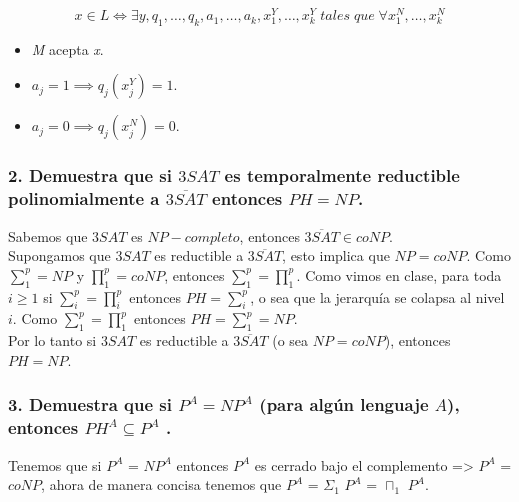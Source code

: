 \documentclass[12pt]{article}
\begin{document}
\begin{equation*}
x \in L \iff \exists y, q_1,\dots,q_k,a_1,\dots,a_k, x^Y_1,\dots,x^Y_k \; tales  \; que \; \forall x^N_1,\dots,x^N_k 
\end{equation*}
\begin{itemize}
\item \textit{M} acepta \textit{x}.
\item $a_j = 1 \implies q_j(x^Y_j) = 1$.
\item $a_j = 0 \implies q_j(x^N_j) = 0$.
\end{itemize}

\subsubsection*{2. Demuestra que si $3SAT$ es temporalmente reductible polinomialmente a $\overline{3SAT}$ entonces $PH = NP$.}
Sabemos que $3SAT$ es $NP-completo$, entonces $\overline{3SAT} \in coNP$. \\
Supongamos que $3SAT$ es reductible a $\overline{3SAT}$, esto implica que $NP = coNP$. Como $\sum_1^p = NP$ y $\prod_1^p = coNP$, entonces $\sum_1^p = \prod_1^p$. Como vimos en clase, para toda $i \geq 1$ si $\sum_i^p = \prod_i^p$ entonces $PH = \sum_i^p$, o sea que la jerarquía se colapsa al nivel $i$. Como $\sum_1^p = \prod_1^p$ entonces $PH = \sum_1^p = NP$. \\
Por lo tanto si $3SAT$ es reductible a $\overline{3SAT}$ (o sea $NP = coNP$), entonces $PH = NP$.

\subsubsection*{3. Demuestra que si $P^A = NP^A$ (para algún lenguaje $A$), entonces $PH^A \subseteq P^A$ .}
Tenemos que si $P^A$ = $NP^A$ entonces $P^A$ es cerrado bajo el complemento => $P^A$ = $coNP$, ahora de manera concisa tenemos que
$P^A$ = $\Sigma_{1}$ $P^A$ = $\sqcap_{1}$ $P^A$. \\
\end{document}
